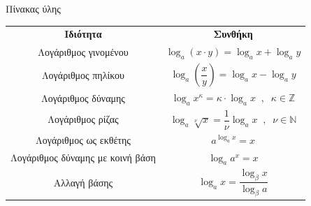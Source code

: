 \documentclass[twoside,nofonts,internet,math,spyros]{frontisthrio}
\begin{document}
\begin{mybox}[mysubtitle]{Πίνακας ύλης}
\begin{center}
\begin{longtable}{cc}
\hline \rule[-2ex]{0pt}{5.5ex} \textbf{Ιδιότητα} & \textbf{Συνθήκη} \\
\hhline{==}\rule[-2ex]{0pt}{5.5ex} Λογάριθμος γινομένου & $ \log_{a}(x\cdot y)=\log_{a}x+\log_{a}y $ \\
\rule[-2ex]{0pt}{5.5ex}  Λογάριθμος πηλίκου & $ \log_{a}\left( \dfrac{x}{y}\right) =\log_{a}x-\log_{a}y $ \\
\rule[-2ex]{0pt}{5.5ex}  Λογάριθμος δύναμης & $ \log_{a}x^\kappa=\kappa\cdot\log_{a}x\;\;,\;\;\kappa\in\mathbb{Z} $ \\
\rule[-2ex]{0pt}{5.5ex}  Λογάριθμος ρίζας & $ \log_{a}\!\sqrt[\nu]{x}=\dfrac{1}{\nu}\log_{a}x\;\;,\;\;\nu\in\mathbb{N} $ \\
\rule[-2ex]{0pt}{5.5ex}  Λογάριθμος ως εκθέτης & $ a^{\log_{a}x}=x $ \\
\rule[-2ex]{0pt}{5.5ex}  Λογάριθμος δύναμης με κοινή βάση & $ \log_{a}a^x=x $ \\
\rule[-2ex]{0pt}{5.5ex}  Αλλαγή βάσης & $ \log_{a}x=\dfrac{\log_{\beta}{x}}{\log_{\beta}{a}} $ \\
\hline
\end{longtable}
\end{center}
\end{mybox}

\newpage
\end{document}

